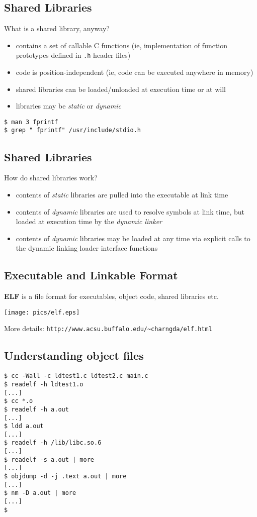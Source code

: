 \documentclass[xga]{xdvislides}
\begin{document}
\subsection{Shared Libraries}
What is a shared library, anyway?
\begin{itemize}
	\item contains a set of callable C functions (ie, implementation
		of function prototypes defined in {\tt .h} header files)
	\item code is position-independent (ie, code can be executed anywhere
		in memory)
	\item shared libraries can be loaded/unloaded at execution time or at will
	\item libraries may be {\em static} or {\em dynamic}
\end{itemize}
\begin{verbatim}
$ man 3 fprintf
$ grep " fprintf" /usr/include/stdio.h
\end{verbatim}


\subsection{Shared Libraries}
How do shared libraries work?
\begin{itemize}
	\item contents of {\em static} libraries are pulled into the
		executable at link time
	\item contents of {\em dynamic} libraries are used to resolve
		symbols at link time, but loaded at execution time by the
		{\em dynamic linker}
	\item contents of {\em dynamic} libraries may be loaded at any
		time via explicit calls to the dynamic linking loader interface
		functions
\end{itemize}

\subsection{Executable and Linkable Format}

{\bf ELF} is a file format for executables, object code, shared libraries
etc.

\begin{center}
	\texttt{[image: pics/elf.eps]}
\end{center}
More details:
\verb+http://www.acsu.buffalo.edu/~charngda/elf.html+
\Normalsize


\subsection{Understanding object files}
\begin{verbatim}
$ cc -Wall -c ldtest1.c ldtest2.c main.c
$ readelf -h ldtest1.o
[...]
$ cc *.o
$ readelf -h a.out
[...]
$ ldd a.out
[...]
$ readelf -h /lib/libc.so.6
[...]
$ readelf -s a.out | more
[...]
$ objdump -d -j .text a.out | more
[...]
$ nm -D a.out | more
[...]
$
\end{verbatim}
\end{document}
